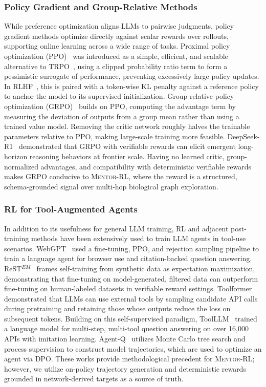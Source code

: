 \documentclass[thesis,letterpaper,12pt]{utthesis}
\begin{document}
\subsubsection{Policy Gradient and Group-Relative Methods}
While preference optimization aligns LLMs to pairwise judgments, policy gradient methods optimize directly against scalar rewards over rollouts, supporting online learning across a wide range of tasks. Proximal policy optimization (PPO)~\cite{schulman2017proximal} was introduced as a simple, efficient, and scalable alternative to TRPO~\cite{schulman2015trust}, using a clipped probability ratio term to form a pessimistic surrogate of performance, preventing excessively large policy updates. In RLHF~\cite{ouyang2022instructgpt}, this is paired with a token-wise KL penalty against a reference policy to anchor the model to its supervised initialization. Group relative policy optimization (GRPO)~\cite{shao2024deepseekmath} builds on PPO, computing the advantage term by measuring the deviation of outputs from a group mean rather than using a trained value model. Removing the critic network roughly halves the trainable parameters relative to PPO, making large-scale training more feasible. DeepSeek-R1~\cite{guo2025deepseek} demonstrated that GRPO with verifiable rewards can elicit emergent long-horizon reasoning behaviors at frontier scale. Having no learned critic, group-normalized advantages, and compatibility with deterministic verifiable rewards makes GRPO conducive to \textsc{Mentor-RL}, where the reward is a structured, schema-grounded signal over multi-hop biological graph exploration. 

\subsubsection{RL for Tool-Augmented Agents}
In addition to its usefulness for general LLM training, RL and adjacent post-training methods have been extensively used to train LLM agents in tool-use scenarios. WebGPT~\cite{nakano2021webgpt} used a fine-tuning, PPO, and rejection sampling pipeline to train a language agent for browser use and citation-backed question answering. ReST$^{EM}$~\cite{singh2023beyond} frames self-training from synthetic data as expectation maximization, demonstrating that fine-tuning on model-generated, filtered data can outperform fine-tuning on human-labeled datasets in verifiable reward settings. Toolformer~\cite{schick2023toolformer} demonstrated that LLMs can use external tools by sampling candidate API calls during pretraining and retaining those whose outputs reduce the loss on subsequent tokens. Building on this self-supervised paradigm, ToolLLM~\cite{qin2023toolllm} trained a language model for multi-step, multi-tool question answering on over 16,000 APIs with imitation learning. Agent-Q~\cite{putta2024agent} utilizes Monte Carlo tree search and process supervision to construct model trajectories, which are used to optimize an agent via DPO. These works provide methodological precedent for \textsc{Mentor-RL}; however, we utilize on-policy trajectory generation and deterministic rewards grounded in network-derived targets as a source of truth. 
\end{document}
